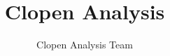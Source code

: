 \documentclass[12pt]{book}
\title{Clopen Analysis}
\author{Clopen Analysis Team}
\date{\Revision{December 2019}}
\theoremstyle{definition}
\begin{document}
\maketitle

\tableofcontents

















\newpage
\printindex
\printbibliography\
\end{document}
